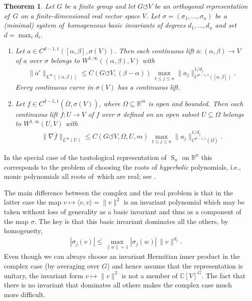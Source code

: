\documentclass[pdftex]{sigma}
\numberwithin{equation}{section}
\newtheorem{Theorem}{Theorem}[section]
\def\al{\alpha}
\def\be{\beta}
\def\si{\sigma}
\def\Om{\Omega}
\def\C{\mathbb{C}}
\def\R{\mathbb{R}}
\def\ol{\overline}
\def\acts{\circlearrowleft}
\let\on=\operatorname
\begin{document}
\begin{Theorem} \label{real}
Let $G$ be a finite group and let $G \acts V$ be an orthogonal representation of~$G$ on a finite-dimensional
 real vector space $V$. Let $\si=(\si_1,\dots,\si_n)$ be a (minimal) system of~homogeneous
 basic invariants of degrees $d_1,\dots,d_n$ and set $d = \max_i d_i$.
\begin{enumerate}\itemsep=0pt
 \item[$1.$] Let $a \in C^{d-1,1}([\al,\be],\si(V))$.
 Then each continuous lift $\overline a \colon (\al,\be) \to V$ of $a$ over $\si$ belongs to $W^{1,\infty}((\al,\be),V)$ with
 \begin{gather*}
 \|\ol a'\|_{L^\infty((\al,\be))} \le
 C(G \acts V,(\be-\al))\, \max_{1 \le j \le n} \|a_j\|^{1/d_j}_{C^{d-1,1}([\al, \be])}.
 \end{gather*}
 Every continuous curve in $\si(V)$ has a continuous lift.
 \item[$2.$] Let $f \in C^{d-1,1}(\ol \Om,\si(V))$,
 where $\Om \subseteq \R^m$ is open and bounded.
 Then each continuous lift $\ol f \colon U \to V$ of $f$ over $\si$ defined on an open subset
 $U \subseteq \Om$ belongs to $W^{1,\infty}(U,V)$ with
 \begin{gather*}
 \|\nabla \ol f\|_{L^\infty(U)} \le
 C(G \acts V,\Om,U,m)\, \max_{1 \le j \le n} \|a_j\|^{1/d_j}_{C^{d-1,1}(\ol \Om)}.
 \end{gather*}
 \end{enumerate}
\end{Theorem}



In the special case of the tautological representation of $\on{S}_n$ on $\R^n$ this corresponds to the problem
of choosing the roots of \emph{hyperbolic} polynomials, i.e., monic polynomials all roots of~which are real;
see \cite{ParusinskiRainerHyp}.

The main difference between the complex and the real problem is that in the latter case
the map $v \mapsto \langle v, v \rangle = \|v\|^2$ is an invariant polynomial which may be taken without loss of generality
as a basic invariant and thus as a component of the map $\si$. The key is that this basic invariant
dominates all the others, by homogeneity,
\begin{gather*}
 |\si_j(v)| \le \max_{\|w\|=1} |\si_j(w)| \, \|v\|^{d_j}.
\end{gather*}
Even though we can always choose an invariant Hermitian inner product in
the complex case (by averaging over $G$) and hence assume that the representation is unitary, the
invariant form $v \mapsto \|v\|^2$ is not a member of $\C[V]^G$.
The fact that there is no invariant that dominates all others makes the complex case much more difficult.
\end{document}

